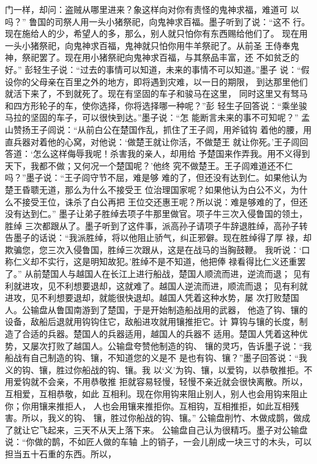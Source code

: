 \documentclass[12pt,UTF8]{ctexbook}
\begin{document}
门一样，却问：盗贼从哪里进来？象这样向对你有责怪的鬼神求福，难道可 
以吗？” 
鲁国的司祭人用一头小猪祭祀，向鬼神求百福。墨子听到了说：“这不 
行。现在施给人的少，希望人的多，那么，别人就只怕你有东西赐给他们了。 
现在用一头小猪祭祀，向鬼神求百福，鬼神就只怕你用牛羊祭祀了。从前圣 
王侍奉鬼神，祭祀罢了。现在用小猪祭祀向鬼神求百福，与其祭品丰富，还 
不如贫乏的好。” 
彭轻生子说：“过去的事情可以知道，未来的事情不可以知道。”墨子 
说：“假设你的父母亲在百里之外的地方，即将遇到灾难，以一日的期限， 
到达那里他们就活下来了，不到就死了。现在有坚固的车子和骏马在这里， 
同时这里又有驽马和四方形轮子的车，使你选择，你将选择哪一种呢？”彭 
轻生子回答说：“乘坐骏马拉的坚固的车子，可以很快到达。”墨子说：“怎 
能断言未来的事不可知呢？” 
孟山赞扬王子闾说：“从前白公在楚国作乱，抓住了王子闾，用斧钺钩 
着他的腰，用直兵器对着他的心窝，对他说：‘做楚王就让你活，不做楚王 
就让你死。’王子闾回答道：‘怎么这样侮辱我呢！杀害我的亲人，却用给 
予楚国来作弄我。用不义得到天下，我都不做；又何况一个楚国呢？’他终 
究不做楚王。王子闾难道还不仁吗？”墨子说：“王子闾守节不屈，难是够 
难的了，但还没有达到仁。如果他认为楚王昏聩无道，那么为什么不接受王 
位治理国家呢？如果他认为白公不义，为什么不接受王位，诛杀了白公再把 
王位交还惠王呢？所以说：难是够难的了，但还没有达到仁。” 
墨子让弟子胜绰去项子牛那里做官。项子牛三次入侵鲁国的领土，胜绰 
三次都跟从了。墨子听到了这件事，派高孙子请项子牛辞退胜绰，高孙子转 
告墨子的话说：“我派胜绰，将以他阻止骄气，纠正邪僻。现在胜绰得了厚 
禄，却欺骗您，您三次入侵鲁国，胜绰三次跟从，这是在战马的当胸鼓鞭。 
我听说：‘口称仁义却不实行，这是明知故犯。’胜绰不是不知道，他把俸 
禄看得比仁义还重罢了。” 
从前楚国人与越国人在长江上进行船战，楚国人顺流而进，逆流而退； 
见有利就进攻，见不利想要退却，这就难了。越国人逆流而进，顺流而退； 
见有利就进攻，见不利想要退却，就能很快退却。越国人凭着这种水势，屡 
次打败楚国人。公输盘从鲁国南游到了楚国，于是开始制造船战用的武器， 
他造了钩、镶的设备，敌船后退就用钩钩住它，敌船进攻就用镶推拒它。计 
算钩与镶的长度，制造了合适的兵器。楚国人的兵器适用，越国人的兵器不 
适用。楚国人凭着这种优势，又屡次打败了越国人。公输盘夸赞他制造的钩、 
镶的灵巧，告诉墨子说：“我船战有自己制造的钩、镶，不知道您的义是不 
是也有钩、镶？”墨子回答说：“我义的钩、镶，胜过你船战的钩、镶。我 
以‘义’为钩、镶，以爱钩，以恭敬推拒。不用爱钩就不会亲，不用恭敬推 
拒就容易轻慢，轻慢不亲近就会很快离散。所以，互相爱，互相恭敬，如此 
互相利。现在你用钩来阻止别人，别人也会用钩来阻止你；你用镶来推拒人， 
人也会用镶来推拒你。互相钩，互相推拒，如此互相残害。所以，我义的钩、 
镶，胜过你船战的钩、镶。” 
公输盘削竹、木做成鹊，做成了就让它飞起来，三天不从天上落下来。 
公输盘自己认为很精巧。墨子对公输盘说：“你做的鹊，不如匠人做的车轴 
上的销子，一会儿削成一块三寸的木头，可以担当五十石重的东西。所以， 
\end{document}
